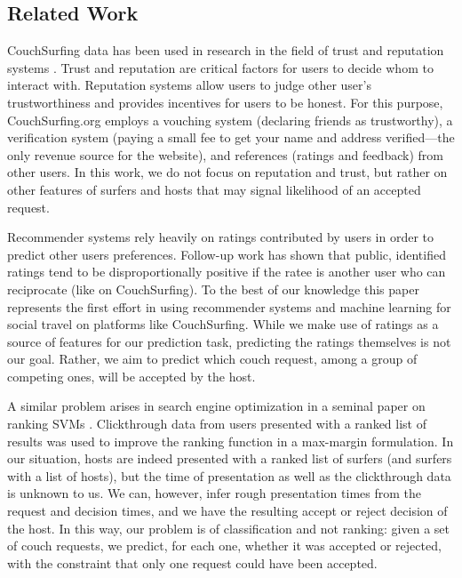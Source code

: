 \subsection{Related Work} \label{sec:related_work}
CouchSurfing data has been used in research in the field of trust and reputation systems \cite{lauterbach2009surfing}.
Trust and reputation are critical factors for users to decide whom to interact with.
Reputation systems allow users to judge other user's trustworthiness and provides incentives for users to be honest.
For this purpose, CouchSurfing.org employs a vouching system (declaring friends as trustworthy), a verification system (paying a small fee to get your name and address verified---the only revenue source for the website), and references (ratings and feedback) from other users.
In this work, we do not focus on reputation and trust, but rather on other features of surfers and hosts that may signal likelihood of an accepted request.

Recommender systems rely heavily on ratings contributed by users in order to predict other users preferences.
Follow-up work has shown that public, identified ratings tend to be disproportionally positive if the ratee is another user who can reciprocate \cite{teng2010rate} (like on CouchSurfing). 
To the best of our knowledge this paper represents the first effort in using recommender systems and machine learning for social travel on platforms like CouchSurfing.
While we make use of ratings as a source of features for our prediction task, predicting the ratings themselves is not our goal.
Rather, we aim to predict which couch request, among a group of competing ones, will be accepted by the host.

A similar problem arises in search engine optimization in a seminal paper on ranking SVMs \cite{Joachims2002}.
Clickthrough data from users presented with a ranked list of results was used to improve the ranking function in a max-margin formulation.
In our situation, hosts are indeed presented with a ranked list of surfers (and surfers with a list of hosts), but the time of presentation as well as the clickthrough data is unknown to us.
We can, however, infer rough presentation times from the request and decision times, and we have the resulting accept or reject decision of the host.
In this way, our problem is of classification and not ranking: given a set of couch requests, we predict, for each one, whether it was accepted or rejected, with the constraint that only one request could have been accepted.

